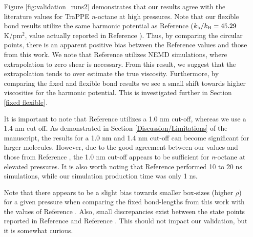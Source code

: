 \documentclass[preprint,review,11pt]{elsarticle}
\begin{document}
	Figure \ref{fig:validation_runs2} demonstrates that our results agree with the literature values for TraPPE \textit{n}-octane at high pressures. Note that our flexible bond results utilize the same harmonic potential as Reference  ($k_{\rm b}/k_{\rm B} = 45.29$ K/pm$^2$, value actually reported in Reference ). Thus, by comparing the circular points, there is an apparent positive bias between the Reference  values and those from this work. We note that Reference  utilizes NEMD simulations, where extrapolation to zero shear is necessary. From this result, we suggest that the extrapolation tends to over estimate the true viscosity. Furthermore, by comparing the fixed and flexible bond results we see a small shift towards higher viscosities for the harmonic potential. This is investigated further in Section \ref{fixed flexible}.
	
	
	
	It is important to note that Reference  utilizes a 1.0 nm cut-off, whereas we use a 1.4 nm cut-off. As demonstrated in Section \ref{Discussion/Limitations} of the manuscript, the results for a 1.0 nm and 1.4 nm cut-off can become significant for larger molecules. However, due to the good agreement between our values and those from Reference , the 1.0 nm cut-off appears to be sufficient for \textit{n}-octane at elevated pressures. It is also worth noting that Reference  performed 10 to 20 ns simulations, while our simulation production time was only 1 ns.
	
	Note that there appears to be a slight bias towards smaller box-sizes (higher $\rho$) for a given pressure when comparing the fixed bond-lengths from this work with the values of Reference . Also, small discrepancies exist between the state points reported in Reference  and Reference . This should not impact our validation, but it is somewhat curious. 
	
\end{document}
